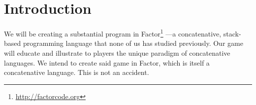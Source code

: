 \documentclass{sig-alternate}
\begin{document}



\section{Introduction}
We will be creating a substantial program in Factor\footnote{ \url{http://factorcode.org}} ---a concatenative, stack-based
programming language that none of us has studied previously. 
Our game will educate and illustrate to players the
unique paradigm of concatenative languages. We intend to create
said game in Factor, which is itself a concatenative language.
This is not an accident. 
\end{document}
